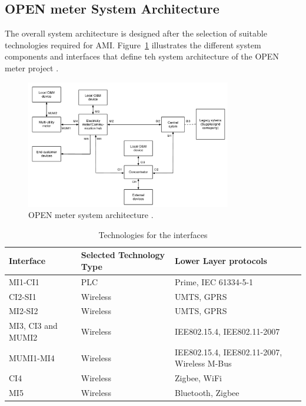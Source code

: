 \subsection{OPEN meter System Architecture}
The overall system architecture is designed after the selection of suitable technologies required for AMI. Figure~\ref{fig:OPEN_sys_arch} illustrates the different system components and interfaces that define teh system architecture of the OPEN meter project \cite{OPEN_mtr_arch}.
\begin{figure}[htb!]
\centering
\includegraphics[width=0.8\textwidth]{images/OPEN_meter_arch}
\caption{OPEN meter system architecture \cite{OPEN_mtr_arch}.}
\label{fig:OPEN_sys_arch}
\end{figure}

\begin{table}[h!]
  \begin{center}
    \begin{tabular}{| p{3.5cm} | p{3cm} | p{4cm} |}
    \hline 
    Interface & Selected Technology Type & Lower Layer protocols \\
    \hline \hline
    MI1-CI1 & PLC & Prime, IEC 61334-5-1 \\
    \hline
    CI2-SI1 & Wireless & UMTS, GPRS \\
    \hline
    MI2-SI2 & Wireless & UMTS, GPRS \\
    \hline
    MI3, CI3 and MUMI2 & Wireless & IEE802.15.4,  IEE802.11-2007 \\
    \hline
    MUMI1-MI4 & Wireless & IEE802.15.4,  IEE802.11-2007, Wireless M-Bus \\
    \hline
    CI4 & Wireless & Zigbee, WiFi \\
    \hline
    MI5 & Wireless & Bluetooth, Zigbee \\
    \hline
    \end{tabular}
  \end{center}
  \caption{Technologies for the interfaces}
  \label{tab:OPEN_intf}
\end{table}

